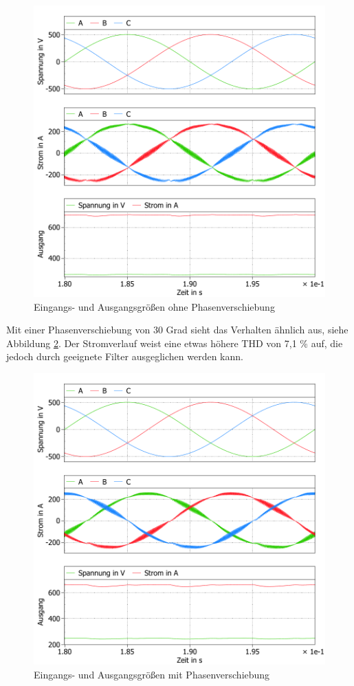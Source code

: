\begin{figure}
	\centering
	\includegraphics[width=1\linewidth]{content/Grafiken/B6_AC+DC_0Grad}
	\caption{Eingangs- und Ausgangsgrößen ohne Phasenverschiebung}
	\label{fig:b6acdc0grad}
\end{figure}
\pagebreak
Mit einer Phasenverschiebung von 30 Grad sieht das Verhalten ähnlich aus, siehe Abbildung \ref{fig:b6acdc30grad}.  Der Stromverlauf weist eine etwas höhere THD von 7,1 \% auf, die jedoch durch geeignete Filter ausgeglichen werden kann.
\begin{figure}
	\centering
	\includegraphics[width=1\linewidth]{content/Grafiken/B6_AC+DC_30Grad}
	\caption{Eingangs- und Ausgangsgrößen mit Phasenverschiebung}
	\label{fig:b6acdc30grad}
\end{figure}

